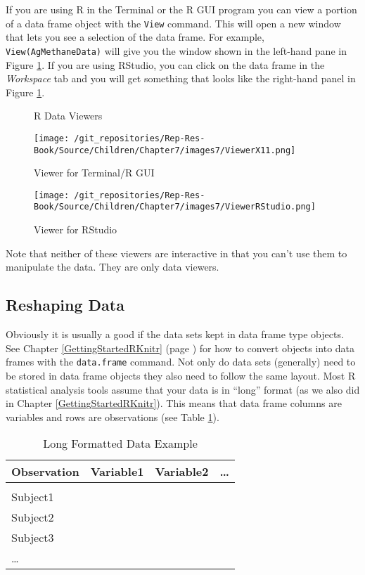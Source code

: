 If you are using R in the Terminal or the R GUI program you can view a portion of a data frame object with the \texttt{View} command. This will open a new window that lets you see a selection of the data frame. For example, \verb|View(AgMethaneData)| will give you the window shown in the left-hand pane in Figure \ref{ViewerFig}. If you are using RStudio, you can click on the data frame in the \emph{Workspace} tab and you will get something that looks like the right-hand panel in Figure \ref{ViewerFig}.

{\small
\begin{figure}
	\caption{R Data Viewers}
	\label{ViewerFig}
	\centering
		\begin{minipage}[b]{0.5\textwidth}
			\centering
  			\texttt{[image: /git\_repositories/Rep-Res-Book/Source/Children/Chapter7/images7/ViewerX11.png]}
  			\caption{Viewer for Terminal/R GUI}
  		\end{minipage}

  		\hfill

 		\begin{minipage}[b]{0.5\textwidth}
  			\centering
  			\texttt{[image: /git\_repositories/Rep-Res-Book/Source/Children/Chapter7/images7/ViewerRStudio.png]}
  			\caption{Viewer for RStudio}
  		\end{minipage}
\end{figure}
}
\noindent Note that neither of these viewers are interactive in that you can't use them to manipulate the data. They are only data viewers.

\subsection{Reshaping Data}

Obviously it is usually a good if the data sets kept in data frame type objects. See Chapter \ref{GettingStartedRKnitr} (page \pageref{data.frame}) for how to convert objects into data frames with the \texttt{data.frame} command. Not only do data sets (generally) need to be stored in data frame objects they also need to follow the same layout. Most R statistical analysis tools assume that your data is in ``long'' format (as we also did in Chapter \ref{GettingStartedRKnitr}). This means that data frame columns are variables and rows are observations (see Table \ref{ExampleLong}).

\begin{table}[h!]
	\caption{Long Formatted Data Example}
	\label{ExampleLong}
	\begin{tabular}{l c c c}
		\hline
		Observation & Variable1 & Variable2 & \ldots \\
		\hline \\[0.1cm]
		Subject1 & & & \\[0.25cm]
		Subject2 & & & \\[0.25cm]
		Subject3 & & & \\[0.25cm]
		\ldots & & & \\[0.25cm]
		\hline
	\end{tabular}
\end{table}

